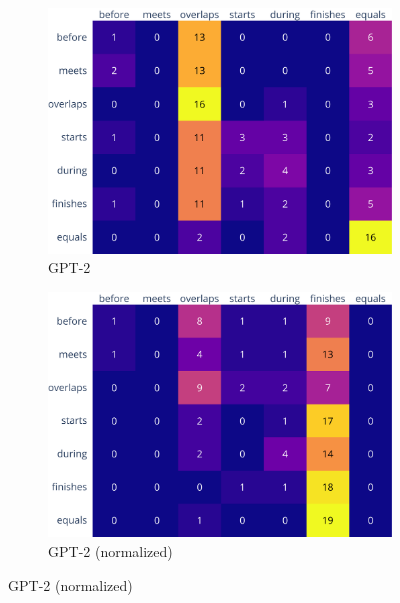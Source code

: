 \documentclass[11pt]{article}
\begin{document}
\begin{figure}
  \centering
    \begin{subfigure}[b]{0.45\textwidth}
      \centering
      \includegraphics[width=0.95\columnwidth, height=0.75\textheight, keepaspectratio, valign=c]{../plots/gpt2_confusion_matrix_counts.pdf}
      \caption{GPT-2}
    \end{subfigure}
    \begin{subfigure}[b]{0.45\textwidth}
      \centering
      \includegraphics[width=0.95\columnwidth, height=0.75\textheight, keepaspectratio, valign=c]{../plots/gpt2_confusion_matrix_counts_normalized.pdf}
      \caption{GPT-2 (normalized)}
    \end{subfigure}

    \vspace{1em}


\end{figure}
\end{document}

